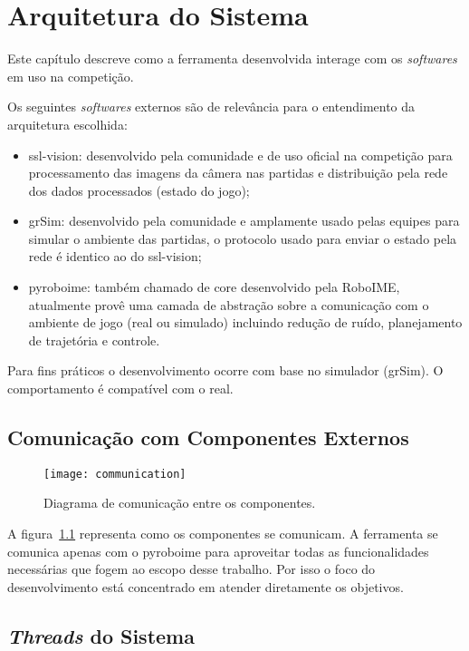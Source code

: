 \chapter{Arquitetura do Sistema}\label{cap:arch_sys}

Este capítulo descreve como a ferramenta desenvolvida interage com os
\textit{softwares} em uso na competição.

Os seguintes \textit{softwares} externos são de relevância para o entendimento
da arquitetura escolhida:

\begin{itemize}
  \item ssl-vision: desenvolvido pela comunidade e de uso oficial na competição
    para processamento das imagens da câmera nas partidas e distribuição pela
    rede dos dados processados (estado do jogo);
  \item grSim: desenvolvido pela comunidade e amplamente usado pelas equipes
    para simular o ambiente das partidas, o protocolo usado para enviar o estado
    pela rede é identico ao do ssl-vision;
  \item pyroboime: também chamado de core desenvolvido pela RoboIME, atualmente provê uma camada de
    abstração sobre a comunicação com o ambiente de jogo (real ou simulado)
    incluindo redução de ruído, planejamento de trajetória e controle.
\end{itemize}

Para fins práticos o desenvolvimento ocorre com base no simulador (grSim).  O
comportamento é compatível com o real.

\section{Comunicação com Componentes Externos}

\begin{figure}[ht]
  \centering
  \texttt{[image: communication]}
  \caption{Diagrama de comunicação entre os componentes.}\label{fig:arch-comm}
\end{figure}

A figura~\ref{fig:arch-comm} representa como os componentes se comunicam.  A
ferramenta se comunica apenas com o pyroboime para aproveitar todas as
funcionalidades necessárias que fogem ao escopo desse trabalho.  Por isso o foco
do desenvolvimento está concentrado em atender diretamente os objetivos.

\section{\textit{Threads} do Sistema}

